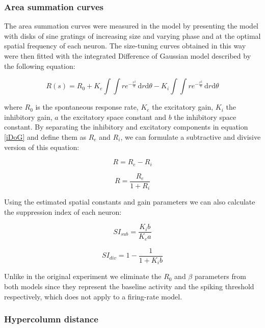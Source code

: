 \subsubsection{Area summation curves} \label{DoG_Section}

The area summation curves were measured in the model by presenting the
model with disks of sine gratings of increasing size and varying phase
and at the optimal spatial frequency of each neuron. The size-tuning
curves obtained in this way were then fitted with the integrated
Difference of Gaussian model described by the following equation:

\begin{equation}
R(s) = R_0 + K_e \int \int re^{-\frac{r^2}{a}} \,
\mathrm{d}r\mathrm{d}\theta - K_i \int\int re^{-\frac{r^2}{b}} \,
\mathrm{d}r\mathrm{d}\theta
\label{iDoG}
\end{equation}

\noindent where $R_0$ is the spontaneous response rate, $K_e$ the
excitatory gain, $K_i$ the inhibitory gain, $a$ the excitatory space
constant and $b$ the inhibitory space constant. By separating the
inhibitory and excitatory components in equation \ref{iDoG} and define
them as $R_e$ and $R_i$, we can formulate a subtractive and divisive
version of this equation:

\begin{equation}
R = R_e - R_i
\label{DoGSubstractive}
\end{equation}

\begin{equation}
R = \frac{R_e}{1+R_i}
\label{DoGDivisive}
\end{equation}

Using the estimated spatial constants and gain parameters we can also
calculate the suppression index of each neuron:

\begin{equation}
  SI_{sub} = \frac{K_i b}{K_e a}
\end{equation}

\begin{equation}
  SI_{div} = 1 - \frac{1}{1+K_i b}
\end{equation}

Unlike in the original experiment we eliminate the $R_0$ and $\beta$
parameters from both models since they represent the baseline activity
and the spiking threshold respectively, which does not apply to a
firing-rate model.

\subsubsection{Hypercolumn distance}

